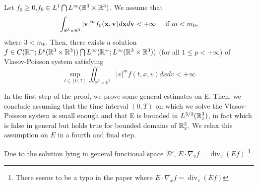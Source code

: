 \begin{theorem}
    Let $f_0\geq 0$,$f_0\in L^1\bigcap L^\infty ({\mathbb{R}}^{3}\times {\mathbb{R}}^{3})$. We assume that 
    \begin{equation}
        \int_{{\mathbb{R}}^{3} \times {\mathbb{R}}^{3}}|\mathbf{v}|^{m} f_{0}(\mathbf{x}, \mathbf{v}) d \mathbf{x} d \mathbf{v}<+\infty \quad \text { if } m<m_{0},
    \end{equation}
    where $3<m_0$. Then, there exists a solution $f\in C({\mathbb{R}}^+; L^p({\mathbb{R}}^{3}\times{\mathbb{R}}^{3}))\bigcap L^\infty ({\mathbb{R}}^+;L^\infty({\mathbb{R}}^{3}\times {\mathbb{R}}^{3}))$ (for all $1\leq p < +\infty$) of Vlasov-Poisson system satisfying 
    \begin{equation}
    \sup _{t \in[0, T]} \iint_{ \mathbb{R}^{3} \times \mathbb{R}^{3}}|v|^{m} f(t, x, v) d x d v<+\infty
    \end{equation}
\end{theorem}

In the first step of the proof, we prove some general estimates
on E. Then, we conclude assuming that the time interval $(0, T)$ on which we
solve the Vlasov-Poisson system is small enough and that E is bounded in
$L^{3/2}({\mathbb{R}}_{x}^{3})$, in fact which is false in general but holds true for bounded domains
of ${\mathbb{R}}_{x}^{3}$. We relax this assumption on $E$ in a fourth and final step.

Due to the solution lying in general functional space $\mathscr{D}'$,  $
    E \cdot \nabla_{v} f=\operatorname{div}_{v}(E f)$ \footnote{There seems to be a typo in the paper where $E \cdot \nabla_{x} f=\operatorname{div}_{v}(E f)$}




